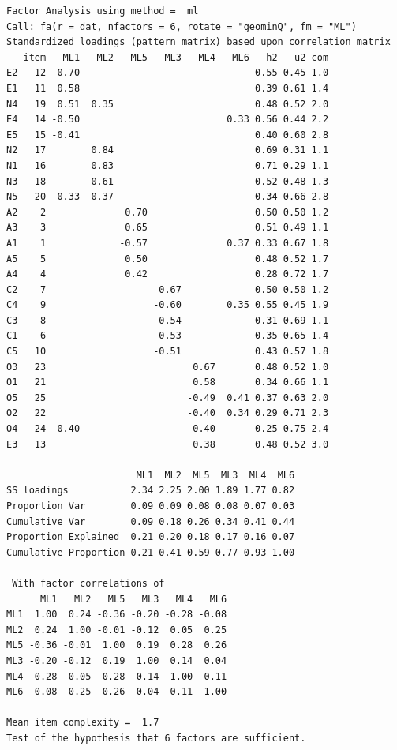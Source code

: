 \documentclass[
  a4paper,
]{ltjsbook}
\begin{document}
\begin{verbatim}
Factor Analysis using method =  ml
Call: fa(r = dat, nfactors = 6, rotate = "geominQ", fm = "ML")
Standardized loadings (pattern matrix) based upon correlation matrix
   item   ML1   ML2   ML5   ML3   ML4   ML6   h2   u2 com
E2   12  0.70                               0.55 0.45 1.0
E1   11  0.58                               0.39 0.61 1.4
N4   19  0.51  0.35                         0.48 0.52 2.0
E4   14 -0.50                          0.33 0.56 0.44 2.2
E5   15 -0.41                               0.40 0.60 2.8
N2   17        0.84                         0.69 0.31 1.1
N1   16        0.83                         0.71 0.29 1.1
N3   18        0.61                         0.52 0.48 1.3
N5   20  0.33  0.37                         0.34 0.66 2.8
A2    2              0.70                   0.50 0.50 1.2
A3    3              0.65                   0.51 0.49 1.1
A1    1             -0.57              0.37 0.33 0.67 1.8
A5    5              0.50                   0.48 0.52 1.7
A4    4              0.42                   0.28 0.72 1.7
C2    7                    0.67             0.50 0.50 1.2
C4    9                   -0.60        0.35 0.55 0.45 1.9
C3    8                    0.54             0.31 0.69 1.1
C1    6                    0.53             0.35 0.65 1.4
C5   10                   -0.51             0.43 0.57 1.8
O3   23                          0.67       0.48 0.52 1.0
O1   21                          0.58       0.34 0.66 1.1
O5   25                         -0.49  0.41 0.37 0.63 2.0
O2   22                         -0.40  0.34 0.29 0.71 2.3
O4   24  0.40                    0.40       0.25 0.75 2.4
E3   13                          0.38       0.48 0.52 3.0

                       ML1  ML2  ML5  ML3  ML4  ML6
SS loadings           2.34 2.25 2.00 1.89 1.77 0.82
Proportion Var        0.09 0.09 0.08 0.08 0.07 0.03
Cumulative Var        0.09 0.18 0.26 0.34 0.41 0.44
Proportion Explained  0.21 0.20 0.18 0.17 0.16 0.07
Cumulative Proportion 0.21 0.41 0.59 0.77 0.93 1.00

 With factor correlations of 
      ML1   ML2   ML5   ML3   ML4   ML6
ML1  1.00  0.24 -0.36 -0.20 -0.28 -0.08
ML2  0.24  1.00 -0.01 -0.12  0.05  0.25
ML5 -0.36 -0.01  1.00  0.19  0.28  0.26
ML3 -0.20 -0.12  0.19  1.00  0.14  0.04
ML4 -0.28  0.05  0.28  0.14  1.00  0.11
ML6 -0.08  0.25  0.26  0.04  0.11  1.00

Mean item complexity =  1.7
Test of the hypothesis that 6 factors are sufficient.


\end{verbatim}
\end{document}
